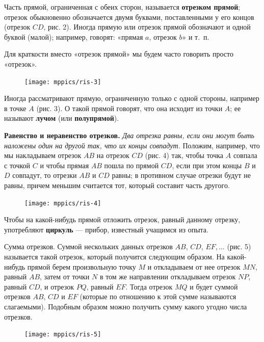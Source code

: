 \documentclass[oneside]{book}
\begin{document}
Часть прямой, ограниченная с обеих сторон, называется \textbf{отрезком прямой};
отрезок обыкновенно обозначается двумя буквами, поставленными у его концов (отрезок $CD$, рис. 2).
Иногда прямую или отрезок прямой 
обозначают и одной буквой
(малой);
например, говорят:
«прямая $a$, отрезок $b$» и т.~п.

Для краткости вместо «отрезок прямой» мы будем часто говорить просто «отрезок».

\begin{figure}
\texttt{[image: mppics/ris-3]}
\caption{}
\end{figure}

Иногда рассматривают прямую, ограниченную только с одной стороны, например в точке $A$ (рис. 3).
О такой прямой говорят, что она исходит из точки $A$;
ее называют \textbf{лучом} (или \textbf{полупрямой}). %

\textbf{Равенство и неравенство отрезков.}
\emph{Два отрезка равны, если они могут быть наложены один на другой так, что их концы совпадут.}
Положим, например, что мы накладываем отрезок $AB$ на
отрезок $CD$ (рис. 4) так, чтобы точка $A$ совпала с точкой $C$ и чтобы прямая $AB$ пошла по прямой $CD$, если при этом концы $B$ и $D$ совпадут, то отрезки $AB$ и $CD$ равны;
в противном случае отрезки будут не равны, причем меньшим считается тот, который составит часть другого.


\begin{figure}[h]
\begin{center}
\texttt{[image: mppics/ris-4]}
\caption{}
\end{center}
\end{figure}


Чтобы на какой-нибудь прямой отложить отрезок, равный данному отрезку, употребляют \textbf{циркуль} — прибор, известный учащимся из опыта.

Сумма отрезков.
Суммой нескольких данных отрезков $AB$, $CD$, $EF,\dots$
(рис. 5) называется такой отрезок, который получится следующим образом.
На какой-нибудь прямой берем произвольную точку $M$ и откладываем от нее отрезок $MN$, равный $AB$, затем от точки $N$ в том же направлении откладываем отрезок $NP$, равный $CD$, и отрезок $PQ$, равный $EF$.
Тогда отрезок $MQ$ и будет суммой отрезков $AB$, $CD$ и $EF$ (которые по отношению к этой сумме называются слагаемыми).
Подобным образом можно получить сумму какого угодно числа отрезков.

\begin{figure}[h]
\begin{center}
\texttt{[image: mppics/ris-5]}
\caption{}
\end{center}
\end{figure}
\end{document}
